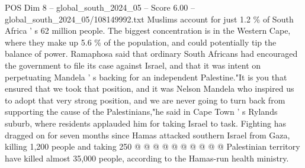 \begin{textsample}{POS Dim 8 – global\_south\_2024\_05 – Score 6.00 – global\_south\_2024\_05/108149992.txt}
Muslims account for just 1.2 \% of South Africa ' s 62 million people.
The biggest concentration is in the Western Cape, where they make up 5.6 \% of the population, and could potentially tip the balance of power.
Ramaphosa said that ordinary South Africans had encouraged the government to file its case against Israel, and that it was intent on perpetuating Mandela ' s backing for an independent Palestine."It is you that ensured that we took that position, and it was Nelson Mandela who inspired us to adopt that very strong position, and we are never going to turn back from supporting the cause of the Palestinians,"he said in Cape Town ' s Rylands suburb, where residents applauded him for taking Israel to task.
Fighting has dragged on for seven months since Hamas attacked southern Israel from Gaza, killing 1,200 people and taking 250 @ @ @ @ @ @ @ @ @ @ Palestinian territory have killed almost 35,000 people, according to the Hamas-run health ministry.

\end{textsample}

